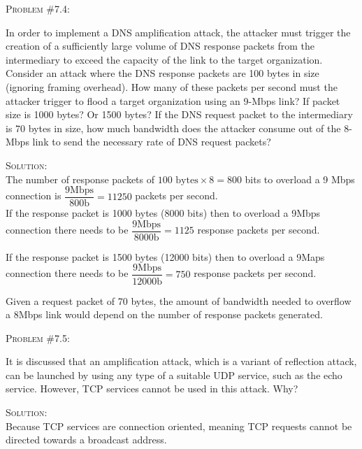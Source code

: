 \documentclass[12pt]{article}
\newenvironment{problem}[1]
{\begin{mdframed}[linewidth=0.8pt]
        \textsc{Problem #1:}

}
    {\end{mdframed}}
\newenvironment{solution}
    {\textsc{Solution:}\\}
    {\newpage}%
\begin{document}
	\begin{problem}{\#7.4}
		In order to implement a DNS amplification attack, the attacker must trigger the creation of a sufficiently large volume of DNS response packets from the intermediary to exceed the capacity of the link to the target organization. Consider an attack where the DNS response packets are 100 bytes in size (ignoring framing overhead). How many of these packets per second must the attacker trigger to flood a target organization using an 9-Mbps link? If packet size is 1000 bytes? Or 1500 bytes? If the DNS request packet to the intermediary is 70 bytes in size, how much bandwidth does the attacker consume out of the 8-Mbps link to send the necessary rate of DNS request packets?
	\end{problem}
	\begin{solution}
	The number of response packets of $100\text{ bytes}\times 8 = 800 $ bits to overload a 9 Mbps connection is $\dfrac{9\text{Mbps}}{800\text{b}} = 11250$ packets per second.\\
	If the response packet is 1000 bytes (8000 bits) then to overload a 9Mbps connection there needs to be $\dfrac{9\text{Mbps}}{8000\text{b}} = 1125$ response packets per second.

	If the response packet is 1500 bytes (12000 bits) then to overload a 9Maps connection there needs to be $\dfrac{9\text{Mbps}}{12000\text{b}} = 750$ response packets per second.

	Given a request packet of 70 bytes, the amount of bandwidth needed to overflow a 8Mbps link would depend on the number of response packets generated. 
	\end{solution}

	\begin{problem}{\#7.5}
		It is discussed that an amplification attack, which is a variant of reflection attack, can be launched by using any type of a suitable UDP service, such as the echo service. However, TCP services cannot be used in this attack. Why?
	\end{problem}
	\begin{solution}
		Because TCP services are connection oriented, meaning TCP requests cannot be directed towards a broadcast address.
	\end{solution}
\end{document}
